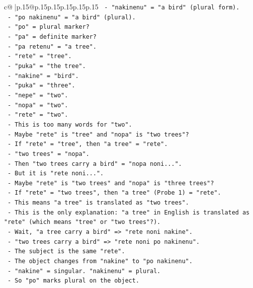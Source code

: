 \documentclass{article}
\begin{document}
{\begin{supertabular}{c@{$\;$}|p{.15\linewidth}@{}p{.15\linewidth}p{.15\linewidth}p{.15\linewidth}p{.15\linewidth}p{.15\linewidth}}
{{{\texttt{   {-} "nakinenu" = "a bird" (plural form).} \\
\texttt{   {-} "po nakinenu" = "a bird" (plural).} \\
\texttt{   {-} "po" = plural marker?} \\
\texttt{   {-} "pa" = definite marker?} \\
\texttt{   {-} "pa retenu" = "a tree".} \\
\texttt{   {-} "rete" = "tree".} \\
\texttt{   {-} "puka" = "the tree".} \\
\texttt{   {-} "nakine" = "bird".} \\
\texttt{   {-} "puka" = "three".} \\
\texttt{   {-} "nepe" = "two".} \\
\texttt{   {-} "nopa" = "two".} \\
\texttt{   {-} "rete" = "two".} \\
\texttt{   {-} This is too many words for "two".} \\
\texttt{   {-} Maybe "rete" is "tree" and "nopa" is "two trees"?} \\
\texttt{   {-} If "rete" = "tree", then "a tree" = "rete".} \\
\texttt{   {-} "two trees" = "nopa".} \\
\texttt{   {-} Then "two trees carry a bird" = "nopa noni...".} \\
\texttt{   {-} But it is "rete noni...".} \\
\texttt{   {-} Maybe "rete" is "two trees" and "nopa" is "three trees"?} \\
\texttt{   {-} If "rete" = "two trees", then "a tree" (Probe 1) = "rete".} \\
\texttt{   {-} This means "a tree" is translated as "two trees".} \\
\texttt{   {-} This is the only explanation: "a tree" in English is translated as "rete" (which means "tree" or "two trees"?).} \\
\texttt{   {-} Wait, "a tree carry a bird" => "rete noni nakine".} \\
\texttt{   {-} "two trees carry a bird" => "rete noni po nakinenu".} \\
\texttt{   {-} The subject is the same "rete".} \\
\texttt{   {-} The object changes from "nakine" to "po nakinenu".} \\
\texttt{   {-} "nakine" = singular. "nakinenu" = plural.} \\
\texttt{   {-} So "po" marks plural on the object.} \\
}}}
\end{supertabular}}
\end{document}
